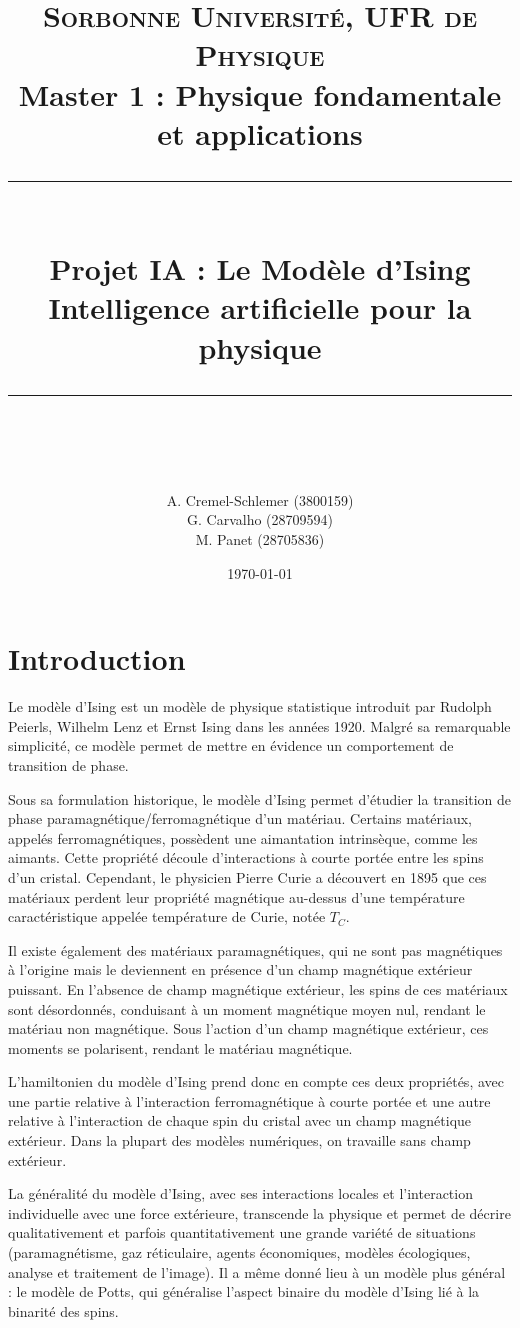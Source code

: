\documentclass[11pt, parskip=half]{scrartcl} %
\title{	
	\normalfont\normalsize
	\large\textsc{Sorbonne Université, UFR de Physique}\\ %
	\vspace{2pt} %
	\normalsize Master 1 : Physique fondamentale et applications\\
	\vspace{25pt} %
	\rule{\linewidth}{0.5pt}\\ %
	\vspace{20pt} %
	{\huge Projet IA : Le Modèle d'Ising}\\ %
	\vspace{2pt} %
	{Intelligence artificielle pour la physique}\\
	\vspace{12pt} %
	\rule{\linewidth}{2pt}\\ %
	\vspace{12pt} %
}
\author{\LARGE A. Cremel-Schlemer \large (3800159) \\ \LARGE G. Carvalho \large (28709594) \\ \LARGE M. Panet \large (28705836)} %
\date{\normalsize\today} %
\begin{document}
\maketitle %
\tableofcontents %
\listoftodos %

\newpage

\section*{Introduction}

Le modèle d'Ising est un modèle de physique statistique introduit par Rudolph Peierls, Wilhelm Lenz et Ernst Ising dans les années 1920. Malgré sa remarquable simplicité, ce modèle permet de mettre en évidence un comportement de transition de phase.

Sous sa formulation historique, le modèle d'Ising permet d'étudier la transition de phase paramagnétique/ferromagnétique d'un matériau. Certains matériaux, appelés ferromagnétiques, possèdent une aimantation intrinsèque, comme les aimants. Cette propriété découle d'interactions à courte portée entre les spins d'un cristal. Cependant, le physicien Pierre Curie a découvert en 1895 que ces matériaux perdent leur propriété magnétique au-dessus d'une température caractéristique appelée température de Curie, notée $T_C$.

Il existe également des matériaux paramagnétiques, qui ne sont pas magnétiques à l'origine mais le deviennent en présence d'un champ magnétique extérieur puissant. En l'absence de champ magnétique extérieur, les spins de ces matériaux sont désordonnés, conduisant à un moment magnétique moyen nul, rendant le matériau non magnétique. Sous l'action d'un champ magnétique extérieur, ces moments se polarisent, rendant le matériau magnétique.

L'hamiltonien du modèle d'Ising prend donc en compte ces deux propriétés, avec une partie relative à l'interaction ferromagnétique à courte portée et une autre relative à l'interaction de chaque spin du cristal avec un champ magnétique extérieur. Dans la plupart des modèles numériques, on travaille sans champ extérieur.

La généralité du modèle d'Ising, avec ses interactions locales et l'interaction individuelle avec une force extérieure, transcende la physique et permet de décrire qualitativement et parfois quantitativement une grande variété de situations (paramagnétisme, gaz réticulaire, agents économiques, modèles écologiques, analyse et traitement de l'image). Il a même donné lieu à un modèle plus général : le modèle de Potts, qui généralise l'aspect binaire du modèle d'Ising lié à la binarité des spins.
\end{document}
